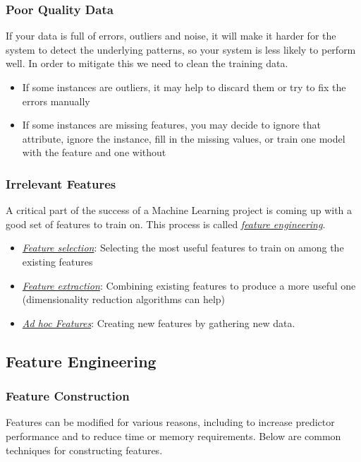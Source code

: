 \documentclass[12pt]{article}
\begin{document}
        \subsubsection{Poor Quality Data}
        If your data is full of errors, outliers and noise, it will make it harder for the system to detect the
        underlying patterns, so your system is less likely to perform well. In order to mitigate this we need to clean
        the training data.
        \begin{itemize}
            \item If some instances are outliers, it may help to discard them or try to fix the errors manually
            \item If some instances are missing features, you may decide to ignore that attribute, ignore the instance,
            fill in the missing values, or train one model with the feature and one without
        \end{itemize}

        \subsubsection{Irrelevant Features}
        A critical part of the success of a Machine Learning project is coming up with a good set of features to train
        on. This process is called \hyperref[sec:FeatureEngineering]{\textit{feature engineering}}.
        \begin{itemize}
            \item \hyperref[sec:FeatureSelection]{\textit{Feature selection}}: Selecting the most useful features to
            train on among the existing features
            \item \hyperref[sec:FeatureExtraction]{\textit{Feature extraction}}: Combining existing features to produce
            a more useful one (dimensionality reduction algorithms can help)
            \item \hyperref[sec:AdhocFeatures]{\textit{Ad hoc Features}}: Creating new features by gathering new data.
        \end{itemize}

    \subsection{Feature Engineering} \label{sec:FeatureEngineering}
        \subsubsection{Feature Construction}
            Features can be modified for various reasons, including to increase predictor performance and to reduce time
            or memory requirements. Below are common techniques for constructing features.
\end{document}
